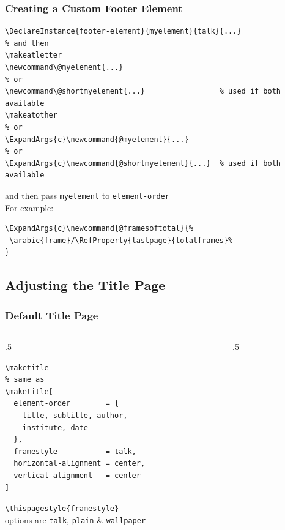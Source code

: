 \documentclass{ltx-talk}
\newcommand{\cs}[1]{\texttt{\textbackslash #1}}
\newcommand{\tubbraced}[1]{\texttt{\{#1\}}}
\begin{document}
\begin{frame*}
\frametitle{Creating a Custom Footer Element}
\begin{verbatim}
\DeclareInstance{footer-element}{myelement}{talk}{...}
% and then
\makeatletter
\newcommand\@myelement{...}
% or
\newcommand\@shortmyelement{...}                 % used if both available
\makeatother
% or
\ExpandArgs{c}\newcommand{@myelement}{...}
% or
\ExpandArgs{c}\newcommand{@shortmyelement}{...}  % used if both available
\end{verbatim}\bigskip
and then pass \texttt{myelement} to \texttt{element-order}\\
For example:
\begin{verbatim}
\ExpandArgs{c}\newcommand{@framesoftotal}{%
 \arabic{frame}/\RefProperty{lastpage}{totalframes}%
}
\end{verbatim}
\end{frame*}

\subsection{Adjusting the Title Page}

\begin{frame*}
\frametitle{Default Title Page}
\begin{columns}
\begin{column}{.5\textwidth}
\begin{verbatim}
\maketitle
% same as
\maketitle[
  element-order        = {
    title, subtitle, author,
    institute, date
  },
  framestyle           = talk,
  horizontal-alignment = center,
  vertical-alignment   = center
]
\end{verbatim}
\cs{thispagestyle}\tubbraced{framestyle}\\
options are \texttt{talk}, \texttt{plain} \& \texttt{wallpaper}
\end{column}
\begin{column}{.5\textwidth}
\maketitle
\end{column}
\end{columns}
\end{frame*}
\end{document}
